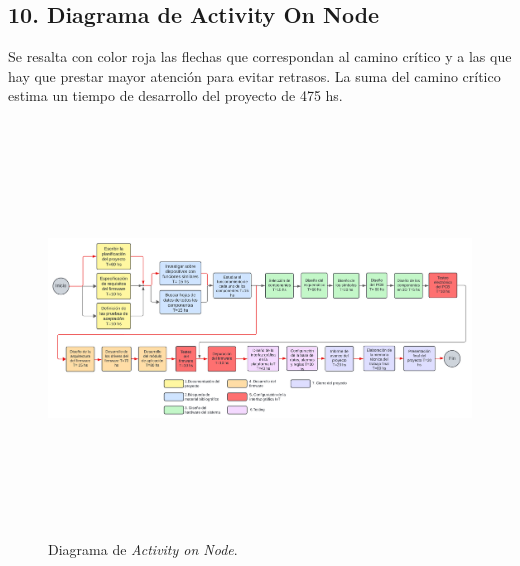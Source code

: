 \documentclass[
11pt, %
codirector, %
]{charter}
\begin{document}
\newpage
\begin{landscape}
\section{10. Diagrama de Activity On Node}
\label{sec:AoN}
Se resalta con color roja las flechas que correspondan al camino crítico y a las que hay que prestar mayor atención para evitar retrasos. La suma del camino crítico estima un tiempo de desarrollo del proyecto de 475 hs.

\begin{figure}[htpb]
	\centering 
	\includegraphics[width=22cm, height=11cm]{./Figuras/diagramaAc.png}
	\caption{Diagrama de \textit{Activity on Node}.}
	\label{fig:AoN}
\end{figure}
\end{landscape}
\end{document}
